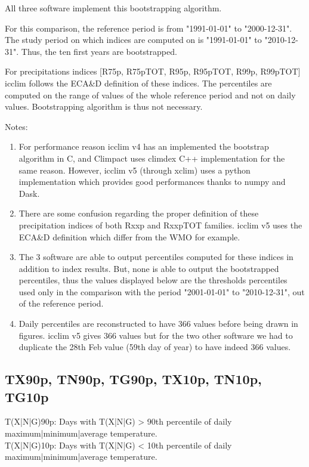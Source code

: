 \documentclass[a4paper,11pt]{article}
\begin{document}
        All three software implement this bootstrapping algorithm.

        For this comparison, the reference period is from "1991-01-01" to "2000-12-31".
        The study period on which indices are computed on is "1991-01-01" to "2010-12-31".
        Thus, the ten first years are bootstrapped.

        For precipitations indices [R75p, R75pTOT, R95p, R95pTOT, R99p, R99pTOT] icclim follows the ECA\&D definition of these indices.
        The percentiles are computed on the range of values of the whole reference period and not on daily values.
        Bootstrapping algorithm is thus not necessary.

        Notes:
        \begin{enumerate}
            \item For performance reason icclim v4 has an implemented the bootstrap algorithm in C, and Climpact uses climdex C++ implementation for the same reason. However, icclim v5 (through xclim) uses a python implementation which provides good performances thanks to numpy and Dask.
            \item There are some confusion regarding the proper definition of these precipitation indices of both Rxxp and RxxpTOT families. icclim v5 uses the ECA\&D definition which differ from the WMO for example.
            \item The 3 software are able to output percentiles computed for these indices in addition to index results. But, none is able to output the bootstrapped percentiles, thus the values displayed below are the thresholds percentiles used only in the comparison with the period "2001-01-01" to "2010-12-31", out of the reference period.
            \item Daily percentiles are reconstructed to have 366 values before being drawn in figures. icclim v5 gives 366 values but for the two other software we had to duplicate the 28th Feb value (59th day of year) to have indeed 366 values.
        \end{enumerate}

        \subsection{TX90p, TN90p, TG90p, TX10p, TN10p, TG10p}
            T(X|N|G)90p: Days with T(X|N|G) > 90th percentile of daily maximum|minimum|average temperature.\\
            T(X|N|G)10p: Days with T(X|N|G) < 10th percentile of daily maximum|minimum|average temperature.\\
\end{document}
